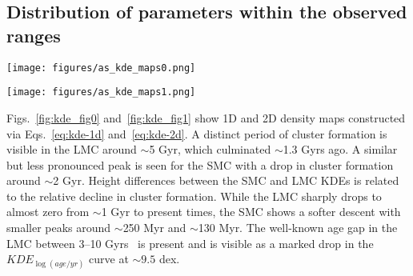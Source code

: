 \documentclass{aa}
\begin{document}

\subsection{Distribution of parameters within the observed ranges}
\label{ssec:dist_ranges}

\begin{figure*}
\texttt{[image: figures/as\_kde\_maps0.png]}
\caption{Adaptive Gaussian KDEs for age, metallicity, and mass. The top and right
plots are 1D KDEs; center plots are 2D KDEs. Observed clusters are plotted as
red and blue stars for the S/LMC, respectively. Sizes are scaled according to
the radius of each cluster. A small scatter is introduced for clarity.}
\label{fig:kde_fig0}
\end{figure*}

\begin{figure*}
\texttt{[image: figures/as\_kde\_maps1.png]}
\caption{Same as Fig.~\ref{fig:kde_fig0} for $E_{(B-V)}$ and distance
modulus.}
\label{fig:kde_fig1}
\end{figure*}

Figs.~\ref{fig:kde_fig0} and~\ref{fig:kde_fig1} show 1D and 2D density maps
constructed via Eqs.~\ref{eq:kde-1d} and~\ref{eq:kde-2d}.
%
%
A distinct period of cluster formation is visible in the LMC around ${\sim}$5
Gyr, which culminated ${\sim}$1.3 Gyrs ago. A similar but less
pronounced peak is seen for the SMC with a drop in cluster formation around
${\sim}$2 Gyr.
Height differences between the SMC and LMC KDEs is related to the relative
decline in cluster formation. While the LMC sharply drops to almost zero from
${\sim}$1 Gyr to present times, the SMC shows a softer descent with smaller
peaks around ${\sim}$250 Myr and ${\sim}$130 Myr.
The well-known age gap in the LMC between 3--10 Gyrs~\citep{Balbinot_2010}
is present and is visible as a marked drop in the $KDE_{\log(age/yr)}$ curve at
$\sim9.5$ dex.
\end{document}
